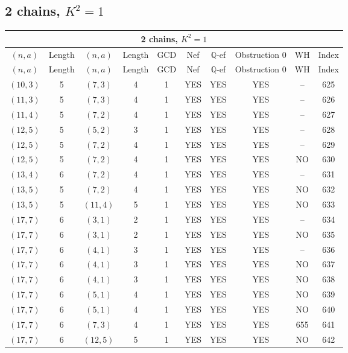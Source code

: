 \subsection{2 chains, \(K^2 = 1\)}
\begin{longtable}{|c|c|c|c|c|c|c|c|c|c|}
\hline
\multicolumn{10}{|c|}{2 chains, $K^2 = 1$}\\
\hline
$(n,a)$ & Length & $(n,a)$ & Length & GCD & Nef & $\mathbb Q$-ef & Obstruction 0 & WH & Index\\
\hline
\endfirsthead

\hline
$(n,a)$ & Length & $(n,a)$ & Length & GCD & Nef & $\mathbb Q$-ef & Obstruction 0 & WH & Index\\
\hline
\endhead
\hline
\endfoot

$(10, 3)$ & 5 & $(7, 3)$ & 4 & 1 & YES & YES & YES & -- & 625\\
$(11, 3)$ & 5 & $(7, 3)$ & 4 & 1 & YES & YES & YES & -- & 626\\
$(11, 4)$ & 5 & $(7, 2)$ & 4 & 1 & YES & YES & YES & -- & 627\\
$(12, 5)$ & 5 & $(5, 2)$ & 3 & 1 & YES & YES & YES & -- & 628\\
$(12, 5)$ & 5 & $(7, 2)$ & 4 & 1 & YES & YES & YES & -- & 629\\
$(12, 5)$ & 5 & $(7, 2)$ & 4 & 1 & YES & YES & YES & NO & 630\\
$(13, 4)$ & 6 & $(7, 2)$ & 4 & 1 & YES & YES & YES & -- & 631\\
$(13, 5)$ & 5 & $(7, 2)$ & 4 & 1 & YES & YES & YES & NO & 632\\
$(13, 5)$ & 5 & $(11, 4)$ & 5 & 1 & YES & YES & YES & NO & 633\\
$(17, 7)$ & 6 & $(3, 1)$ & 2 & 1 & YES & YES & YES & -- & 634\\
$(17, 7)$ & 6 & $(3, 1)$ & 2 & 1 & YES & YES & YES & NO & 635\\
$(17, 7)$ & 6 & $(4, 1)$ & 3 & 1 & YES & YES & YES & -- & 636\\
$(17, 7)$ & 6 & $(4, 1)$ & 3 & 1 & YES & YES & YES & NO & 637\\
$(17, 7)$ & 6 & $(4, 1)$ & 3 & 1 & YES & YES & YES & NO & 638\\
$(17, 7)$ & 6 & $(5, 1)$ & 4 & 1 & YES & YES & YES & NO & 639\\
$(17, 7)$ & 6 & $(5, 1)$ & 4 & 1 & YES & YES & YES & NO & 640\\
$(17, 7)$ & 6 & $(7, 3)$ & 4 & 1 & YES & YES & YES & 655 & 641\\
$(17, 7)$ & 6 & $(12, 5)$ & 5 & 1 & YES & YES & YES & NO & 642\\

\end{longtable}

